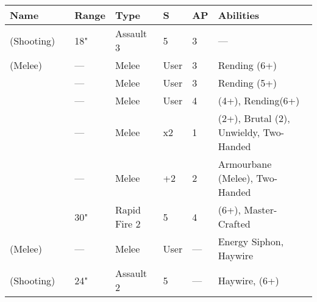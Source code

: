 \noindent
\begin{tabular}{||m{110pt} m{30pt} m{31pt} m{55pt} m{12pt} m{12pt} m{210pt}||}
	\hline
	Name & & Range & Type & S & AP & Abilities \\
	\hline
	\quickref{Staff of Light} (Shooting) & & 18" & Assault 3 & 5 & 3 & — \\
	\quickref{Staff of Light} (Melee) & & — & Melee & User & 3 & Rending (6+) \\
	\quickref{Hyperphase Sword} &  & — & Melee & User & 3 & Rending (5+) \\
	\quickref{Voidblade} &  & — & Melee & User & 4 & \quickref{Entropic Strike} (4+), Rending(6+) \\
	\quickref{Voidscythe} &  & — & Melee & x2 & 1 & \quickref{Entropic Strike} (2+), Brutal (2), Unwieldy, Two-Handed \\
	\quickref{Warscythe} &  & — & Melee & +2 & 2 & Armourbane (Melee), Two-Handed \\
	\quickref{Relic Gauss Blaster} & & 30" & Rapid Fire 2 & 5 & 4 & \quickref{Gauss} (6+), Master-Crafted \\
	\quickref{Rod of Night} (Melee) & & — & Melee & User & — & Energy Siphon, Haywire \\
	\quickref{Rod of Night} (Shooting) & & 24" & Assault 2 & 5 & — & Haywire, \quickref{Tesla} (6+) \\
	\hline
\end{tabular}

